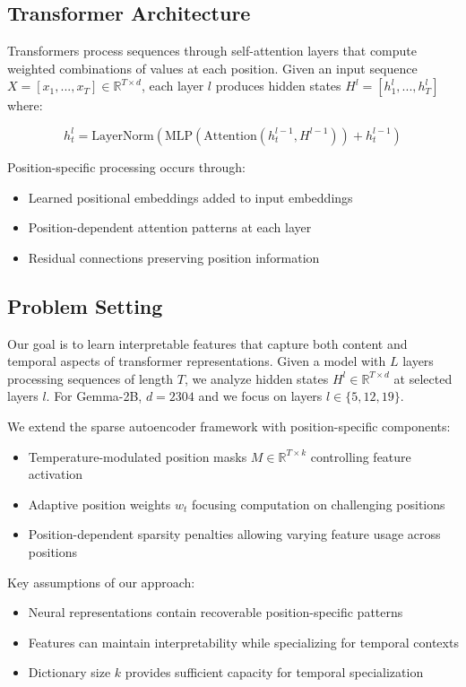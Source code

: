 \documentclass{article} %
\begin{document}
\subsection{Transformer Architecture}
Transformers \cite{vaswani2017attention} process sequences through self-attention layers that compute weighted combinations of values at each position. Given an input sequence $X = [x_1, ..., x_T] \in \mathbb{R}^{T \times d}$, each layer $l$ produces hidden states $H^l = [h^l_1, ..., h^l_T]$ where:

\begin{equation}
    h^l_t = \text{LayerNorm}(\text{MLP}(\text{Attention}(h^{l-1}_t, H^{l-1})) + h^{l-1}_t)
\end{equation}

Position-specific processing occurs through:
\begin{itemize}
    \item Learned positional embeddings added to input embeddings
    \item Position-dependent attention patterns at each layer
    \item Residual connections preserving position information
\end{itemize}

\subsection{Problem Setting}
\label{subsec:problem}
Our goal is to learn interpretable features that capture both content and temporal aspects of transformer representations. Given a model with $L$ layers processing sequences of length $T$, we analyze hidden states $H^l \in \mathbb{R}^{T \times d}$ at selected layers $l$. For Gemma-2B, $d=2304$ and we focus on layers $l \in \{5,12,19\}$.

We extend the sparse autoencoder framework with position-specific components:
\begin{itemize}
    \item Temperature-modulated position masks $M \in \mathbb{R}^{T \times k}$ controlling feature activation
    \item Adaptive position weights $w_t$ focusing computation on challenging positions
    \item Position-dependent sparsity penalties allowing varying feature usage across positions
\end{itemize}

Key assumptions of our approach:
\begin{itemize}
    \item Neural representations contain recoverable position-specific patterns
    \item Features can maintain interpretability while specializing for temporal contexts
    \item Dictionary size $k$ provides sufficient capacity for temporal specialization
\end{itemize}
\end{document}
